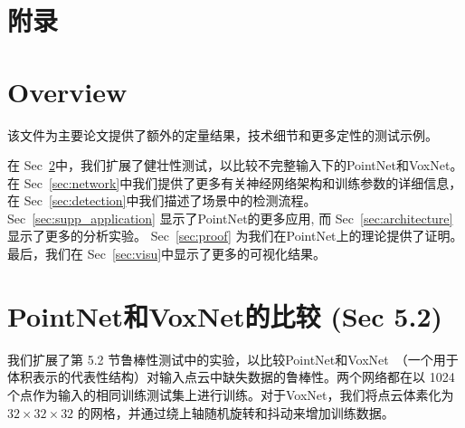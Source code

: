 \appendix
\section*{附录}

\section{Overview}
该文件为主要论文提供了额外的定量结果，技术细节和更多定性的测试示例。 

在 Sec~\ref{sec:cla_robust}中，我们扩展了健壮性测试，以比较不完整输入下的PointNet和VoxNet。 在 Sec~\ref{sec:network}中我们提供了更多有关神经网络架构和训练参数的详细信息， 在 Sec~\ref{sec:detection}中我们描述了场景中的检测流程。Sec~\ref{sec:supp_application} 显示了PointNet的更多应用, 而 Sec~\ref{sec:architecture} 显示了更多的分析实验。 Sec~\ref{sec:proof} 为我们在PointNet上的理论提供了证明。 最后，我们在 Sec~\ref{sec:visu}中显示了更多的可视化结果。


\section{PointNet和VoxNet的比较 (Sec 5.2)}
\label{sec:cla_robust}
我们扩展了第 5.2 节鲁棒性测试中的实验，以比较PointNet和VoxNet~\cite{maturana2015voxnet}（一个用于体积表示的代表性结构）对输入点云中缺失数据的鲁棒性。两个网络都在以 1024 个点作为输入的相同训练测试集上进行训练。对于VoxNet，我们将点云体素化为 $32 \times 32 \times 32$ 的网格，并通过绕上轴随机旋转和抖动来增加训练数据。

